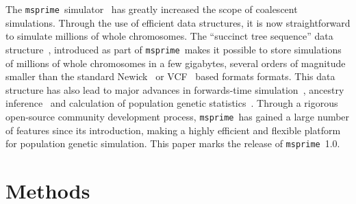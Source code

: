 \documentclass{article}
\newcommand{\msprime}[0]{\texttt{msprime}}
\begin{document}
The \msprime\ simulator~\citep{kelleher2016efficient,kelleher2020coalescent}
has greatly increased the scope of coalescent simulations.
Through the use of efficient data structures, it is
now straightforward to simulate millions of whole chromosomes.
The ``succinct tree sequence'' data
structure~\citep{kelleher2016efficient,kelleher2018efficient,kelleher2019inferring,
wohns2021unified},
introduced as part of \msprime\, makes it possible to store simulations
of millions of whole chromosomes in a few gigabytes, several orders
of magnitude smaller than the standard
Newick~\citep{felsenstein1989phylip} or
VCF~\citep{danecek2011variant} based formats formats.
This data structure has
also lead to major advances in forwards-time
simulation~\citep{kelleher2018efficient,haller2018tree},
ancestry inference~\citep{kelleher2019inferring,wohns2021unified}
and calculation of population genetic statistics~\citep{ralph2019efficiently}.
Through a rigorous open-source community development process,
\msprime\ has gained a large number of features since its introduction,
making a highly efficient and flexible platform for population
genetic simulation.
This paper marks the release of \msprime\ 1.0.

%


\section{Methods}
\end{document}
